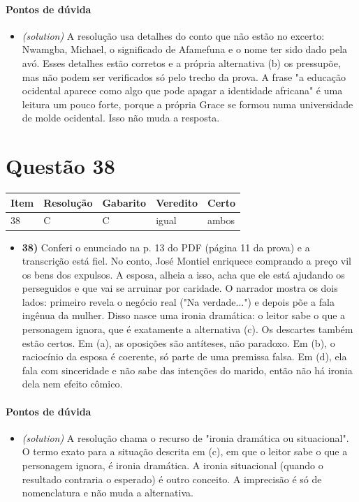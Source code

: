 \documentclass{article}%
\begin{document}
\paragraph{Pontos de dúvida}%
\begin{itemize}%
\item%
\textit{(solution)} A resolução usa detalhes do conto que não estão no excerto: Nwamgba, Michael, o significado de Afamefuna e o nome ter sido dado pela avó. Esses detalhes estão corretos e a própria alternativa (b) os pressupõe, mas não podem ser verificados só pelo trecho da prova. A frase "a educação ocidental aparece como algo que pode apagar a identidade africana" é uma leitura um pouco forte, porque a própria Grace se formou numa universidade de molde ocidental. Isso não muda a resposta.%
\end{itemize}%
\section*{Questão 38}%
\begin{longtable}{@{}p{} p{} p{} p{} p{}@{}}\toprule Item & Resolução & Gabarito & Veredito & Certo \\ \midrule
38 & C & C & igual & ambos \\
\bottomrule\end{longtable}%
\begin{itemize}%
\item%
\textbf{38)} Conferi o enunciado na p. 13 do PDF (página 11 da prova) e a transcrição está fiel. No conto, José Montiel enriquece comprando a preço vil os bens dos expulsos. A esposa, alheia a isso, acha que ele está ajudando os perseguidos e que vai se arruinar por caridade. O narrador mostra os dois lados: primeiro revela o negócio real ("Na verdade...") e depois põe a fala ingênua da mulher. Disso nasce uma ironia dramática: o leitor sabe o que a personagem ignora, que é exatamente a alternativa (c). Os descartes também estão certos. Em (a), as oposições são antíteses, não paradoxo. Em (b), o raciocínio da esposa é coerente, só parte de uma premissa falsa. Em (d), ela fala com sinceridade e não sabe das intenções do marido, então não há ironia dela nem efeito cômico.%
\end{itemize}%
\paragraph{Pontos de dúvida}%
\begin{itemize}%
\item%
\textit{(solution)} A resolução chama o recurso de "ironia dramática ou situacional". O termo exato para a situação descrita em (c), em que o leitor sabe o que a personagem ignora, é ironia dramática. A ironia situacional (quando o resultado contraria o esperado) é outro conceito. A imprecisão é só de nomenclatura e não muda a alternativa.%
\end{itemize}%
\end{document}
